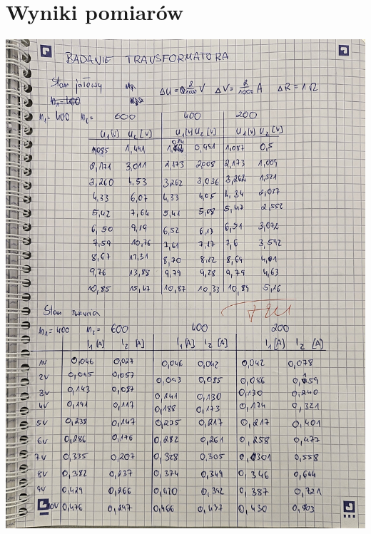 \documentclass[a4paper, 11pt]{article}
\begin{document}
\section{Wyniki pomiarów}\label{sec:wyniki_pomiarow} %
\includegraphics[scale=0.2]{images/img1.jpg}
\end{document}
